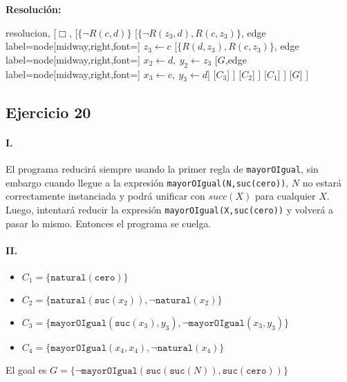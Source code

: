 \documentclass[10pt,a4paper]{article}
\begin{document}
\textbf{Resolución:}
\begin{center}
	\begin{forest} resolucion,
[$\Box$,
    [$\{ \lnot R(c\comma d)\}$
        [$\{\lnot R(z_3\comma d)\comma R(c\comma z_3)\}$, edge label={node[midway,right,font=\footnotesize] {$z_3\leftarrow c$}}
            [$\{ R(d\comma z_3)\comma R(c\comma z_3)\}$, edge label={node[midway,right,font=\footnotesize] {$x_2\leftarrow d,~y_2\leftarrow z_3$}}
                [$G$,edge label={node[midway,right,font=\footnotesize] {$x_3\leftarrow c,~y_3\leftarrow d$}}]
                [$C_3$]
            ]
            [$C_2$]
        ]
        [$C_1$]
    ]
    [$G$]
]
	\end{forest}
\end{center}

\newpage
\subsection{Ejercicio 20}
\paragraph{I.} El programa reducirá siempre usando la primer regla de \texttt{mayorOIgual}, sin embargo cuando llegue a la expresión \texttt{mayorOIgual(N,suc(cero))}, $N$ no estará correctamente instanciada y podrá unificar con $succ(X)$ para cualquier $X$. Luego, intentará reducir la expresión \texttt{mayorOIgual(X,suc(cero))} y volverá a pasar lo mismo. Entonces el programa se cuelga.

\paragraph{II.}
\begin{itemize}
    \item $C_1 = \{\texttt{natural}(\texttt{cero}) \}$
    \item $C_2 = \{\texttt{natural}(\texttt{suc}(x_2)), \lnot \texttt{natural}(x_2) \}$
    \item $C_3 = \{\texttt{mayorOIgual}(\texttt{suc}(x_3),y_3), \lnot \texttt{mayorOIgual}(x_3,y_3) \}$
    \item $C_4 = \{\texttt{mayorOIgual}(x_4,x_4), \lnot \texttt{natural}(x_4) \}$
\end{itemize}

El goal es $ G = \{ \lnot \texttt{mayorOIgual}(\texttt{suc}(\texttt{suc}(N)),\texttt{suc}(\texttt{cero}))\}$
\end{document}
